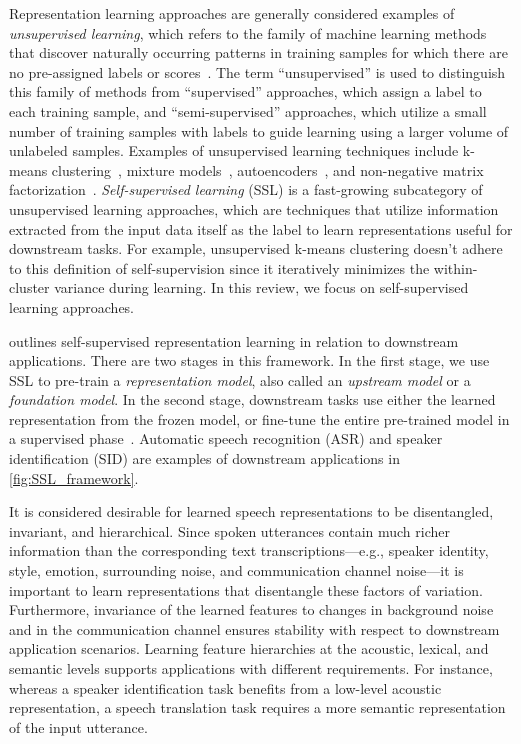 Representation learning approaches are generally considered examples of \textit{unsupervised
learning}, which refers to the family of machine learning methods that discover
naturally occurring patterns in training samples for which there are no pre-assigned
labels or scores~\cite{jordan_machine_2015}. 
The term ``unsupervised'' is used to distinguish this family of methods from
``supervised'' approaches, which assign a label to each training sample, and
``semi-supervised'' approaches, which utilize a small number of training samples
with labels to guide learning using a larger volume of unlabeled samples.
Examples of unsupervised learning techniques include k-means clustering~\cite{gray_vector_1984}, mixture models~\cite{jordan_hierarchical_1994}, autoencoders~\cite{hinton_autoencoders_1994},
and non-negative matrix factorization~\cite{lee_learning_1999}. 
\textit{Self-supervised learning} (SSL) is a fast-growing subcategory of
unsupervised learning approaches, which are techniques that utilize
information extracted from the input data itself as the label to learn
representations useful for 
downstream tasks. {\color{black} For example, unsupervised k-means clustering doesn't adhere to this definition of self-supervision since it iteratively minimizes the within-cluster variance during learning.}
In this review, we
focus on self-supervised learning approaches.

 outlines self-supervised representation learning in
relation to downstream applications. 
There are two stages in this framework.
In the first stage, we use SSL to pre-train a \textit{representation model},
also called an \textit{upstream model} or a \textit{foundation model}.
In the second stage, downstream tasks use either the learned
representation from the frozen model, or fine-tune the entire pre-trained model
in a supervised phase~\cite{hinton_reducing_2006}. 
Automatic speech recognition (ASR) and speaker identification (SID) are 
examples of downstream applications in \cref{fig:SSL_framework}.

It is considered desirable for learned speech representations to be
disentangled, invariant, and hierarchical.
Since spoken utterances contain much richer information than the corresponding text
transcriptions---e.g., speaker identity, style, emotion, surrounding noise, and
communication channel noise---it is important to learn representations that
disentangle these factors of variation. Furthermore, invariance of the learned
features to changes in background noise and in the communication channel ensures
stability with respect to downstream application scenarios. Learning feature
hierarchies at the acoustic, lexical, and semantic levels supports applications
with different requirements. For instance, whereas a speaker identification task
benefits from a low-level acoustic representation, a speech
translation task requires a more semantic representation of the input
utterance. 

